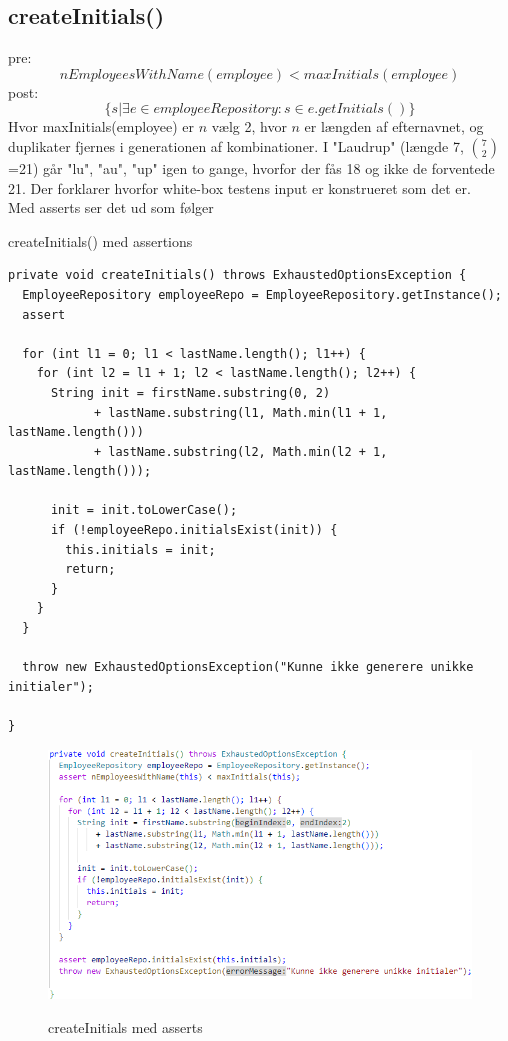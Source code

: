 \subsection{createInitials()} \label{sec:contract_create_initials}
pre:
\begin{equation}
    nEmployeesWithName(employee) < maxInitials(employee)
\end{equation}
post:
\begin{equation}
    \{s | \exists e \in employeeRepository : s \in e.getInitials()\}
\end{equation}
Hvor maxInitials(employee) er $n$ vælg 2, hvor $n$ er længden af efternavnet, og duplikater fjernes i generationen af kombinationer.
I "Laudrup" (længde 7, $7 \choose 2$=21) går "lu", "au", "up" igen to gange, hvorfor der fås 18 og ikke de forventede 21. Der forklarer hvorfor white-box testens input er konstrueret som det er.\\[4mm]
Med asserts ser det ud som følger

\begin{listing}[H]
    \centering
    \caption{createInitials() med assertions}\label{lst:create_initials_assertions}
    \begin{verbatim}
private void createInitials() throws ExhaustedOptionsException {
  EmployeeRepository employeeRepo = EmployeeRepository.getInstance();
  assert 

  for (int l1 = 0; l1 < lastName.length(); l1++) {
    for (int l2 = l1 + 1; l2 < lastName.length(); l2++) {
      String init = firstName.substring(0, 2)
            + lastName.substring(l1, Math.min(l1 + 1, lastName.length()))
            + lastName.substring(l2, Math.min(l2 + 1, lastName.length()));

      init = init.toLowerCase();
      if (!employeeRepo.initialsExist(init)) {
        this.initials = init;
        return;
      }
    }
  }

  throw new ExhaustedOptionsException("Kunne ikke generere unikke initialer");

}
    \end{verbatim}
\end{listing}


\begin{figure}[H]
    \centering
    \caption{createInitials med asserts}
    \includegraphics[width = \textwidth, keepaspectratio]{ImplementationAndTest/Diagrams/contract_createInitials.png}
    \label{fig:contract_createInitials}
\end{figure}
